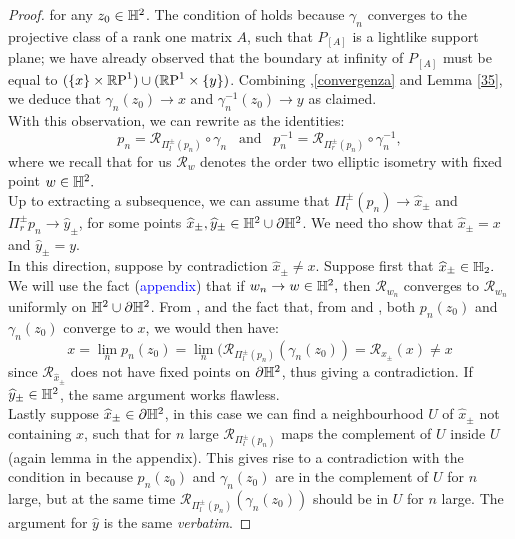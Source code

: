\begin{proof}
  for any $z_0\in\H^2$. The condition of  holds because $\gamma_n$ converges to the projective class of a rank one matrix $A$, such that $P_{[A]}$ is a lightlike support plane; we have already observed that the boundary at infinity of $P_[A]$ must be equal to $(\{x\}\times\S)\cup(\S\times\{y\})$. Combining ,\ref{convergenza} and Lemma \ref{35}, we deduce that $\gamma_n(z_0)\to x$ and $\gamma_n^{-1}(z_0)\to y$ as claimed. \\
  With this observation, we can rewrite  as the identities: 
  \begin{equation}\label{21}
    p_n=\mathcal{R}_{\Pi_l^\pm(p_n)}\circ\gamma_n \;\;\; \text{and}\;\;\; p_n^{-1}=\mathcal{R}_{\Pi_r^\pm(p_n)}\circ\gamma_n^{-1}, 
  \end{equation} 
  where we recall that for us $\mathcal{R}_w$ denotes the order two elliptic isometry with fixed point $w\in\H^2.$ \\
  Up to extracting a subsequence, we can assume that $\Pi_l^{\pm}(p_n)\to\widehat{x}_\pm$ and $\Pi_r^\pm{p_n}\to\widehat{y}_\pm$, for some points $\widehat{x}_\pm, \widehat{y}_\pm\in\H^2\cup\partial\H^2$. We need tho show that $\widehat{x}_\pm=x$ and $\widehat{y}_\pm=y$. \\
  In this direction, suppose by contradiction $\widehat{x}_\pm\neq x$. Suppose first that $\widehat{x}_\pm\in\H_2.$ We will use the fact (\textcolor{blue}{appendix})
  that if $w_n\to w\in \H^2,$ then $\mathcal{R}_{w_n}$ converges to $\mathcal{R}_{w_n}$ uniformly on $\H^2\cup\partial\H^2$. From , and the fact that, from  and , both $p_n(z_0)$ and $\gamma_n(z_0)$ converge to $x$, we would then have: 
  \[
    x=\lim_n p_n(z_0)=\lim_n(\mathcal{R}_{\Pi_l^\pm(p_n)}(\gamma_n(z_0))=\mathcal{R}_{\widehat{x}_\pm}(x)\neq x
  \]
  since $\mathcal{R}_{\widehat{x}_\pm}$ does not have fixed points on $\partial\H^2$, thus giving a contradiction. If $\widehat{y}_\pm\in\H^2$, the same argument works flawless. \\
  Lastly suppose $\widehat{x}_\pm\in\partial\H^2$, in this case we can find a neighbourhood $U$ of $\widehat{x}_\pm$ not containing $x$, such that for $n$ large $\mathcal{R}_{\Pi_l^\pm(p_n)}$ maps the complement of $U$ inside $U$ (again lemma in the appendix). This gives rise to a contradiction with the condition in  because $p_n(z_0)$ and $\gamma_n(z_0)$ are in the complement of $U$ for $n$ large, but at the same time $\mathcal{R}_{\Pi_l^{\pm}(p_n)}(\gamma_n(z_0))$ should be in $U$ for $n$ large. The argument for $\widehat{y}$ is the same \textit{verbatim}.
\end{proof}


